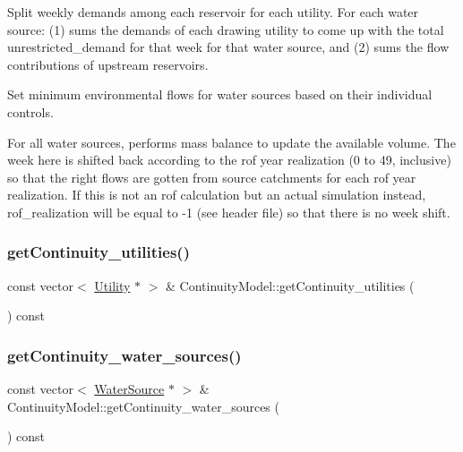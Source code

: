 Split weekly demands among each reservoir for each utility. For each water source\+: (1) sums the demands of each drawing utility to come up with the total unrestricted\+\_\+demand for that week for that water source, and (2) sums the flow contributions of upstream reservoirs.

Set minimum environmental flows for water sources based on their individual controls.

For all water sources, performs mass balance to update the available volume. The week here is shifted back according to the rof year realization (0 to 49, inclusive) so that the right flows are gotten from source catchments for each rof year realization. If this is not an rof calculation but an actual simulation instead, rof\+\_\+realization will be equal to -\/1 (see header file) so that there is no week shift.\mbox{\label{classContinuityModel_a922c1dea6e49d67c87a7fbb34c7bc623_a922c1dea6e49d67c87a7fbb34c7bc623}} 
\subsubsection{\texorpdfstring{get\+Continuity\+\_\+utilities()}{getContinuity\_utilities()}}
{\footnotesize\ttfamily const vector$<$ \mbox{\hyperlink{classUtility}{Utility}} $\ast$ $>$ \& Continuity\+Model\+::get\+Continuity\+\_\+utilities (\begin{DoxyParamCaption}{ }\end{DoxyParamCaption}) const}

\mbox{\label{classContinuityModel_ae0dec8510ab216accd44097e5a366bd8_ae0dec8510ab216accd44097e5a366bd8}} 
\subsubsection{\texorpdfstring{get\+Continuity\+\_\+water\+\_\+sources()}{getContinuity\_water\_sources()}}
{\footnotesize\ttfamily const vector$<$ \mbox{\hyperlink{classWaterSource}{Water\+Source}} $\ast$ $>$ \& Continuity\+Model\+::get\+Continuity\+\_\+water\+\_\+sources (\begin{DoxyParamCaption}{ }\end{DoxyParamCaption}) const}

